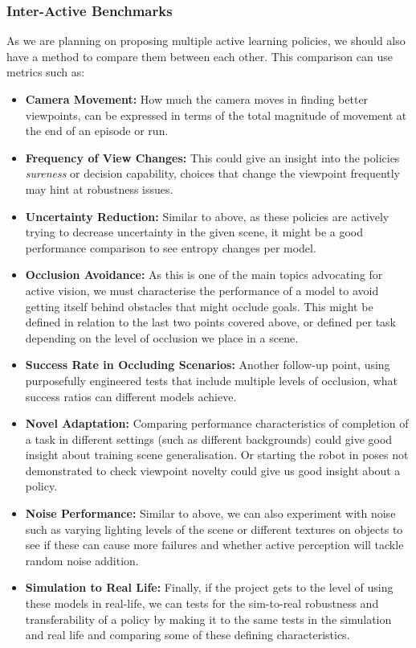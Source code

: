 \subsubsection{Inter-Active Benchmarks}
As we are planning on proposing multiple active learning policies, we should also have a method to compare them between each other. This comparison can use metrics such as:
\begin{itemize}
  \item \textbf{Camera Movement:} How much the camera moves in finding better viewpoints, can be expressed in terms of the total magnitude of movement at the end of an episode or run.
  \item \textbf{Frequency of View Changes:} This could give an insight into the policies \emph{sureness} or decision capability, choices that change the viewpoint frequently may hint at robustness issues.
  \item \textbf{Uncertainty Reduction:} Similar to above, as these policies are actively trying to decrease uncertainty in the given scene, it might be a good performance comparison to see entropy changes per model.
  \item \textbf{Occlusion Avoidance:} As this is one of the main topics advocating for active vision, we must characterise the performance of a model to avoid getting itself behind obstacles that might occlude goals. This might be defined in relation to the last two points covered above, or defined per task depending on the level of occlusion we place in a scene.
  \item \textbf{Success Rate in Occluding Scenarios:} Another follow-up point, using purposefully engineered tests that include multiple levels of occlusion, what success ratios can different models achieve. 
  \item \textbf{Novel Adaptation:} Comparing performance characteristics of completion of a task in different settings (such as different backgrounds) could give good insight about training scene generalisation. Or starting the robot in poses not demonstrated to check viewpoint novelty could give us good insight about a policy.
  \item \textbf{Noise Performance:} Similar to above, we can also experiment with noise such as varying lighting levels of the scene or different textures on objects to see if these can cause more failures and whether active perception will tackle random noise addition.
  \item \textbf{Simulation to Real Life:} Finally, if the project gets to the level of using these models in real-life, we can tests for the sim-to-real robustness and transferability of a policy by making it to the same tests in the simulation and real life and comparing some of these defining characteristics.
\end{itemize}

